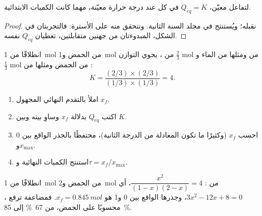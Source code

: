 \begin{proposition}\label{prop:g12:equilibrium:constant}
لتفاعل معيّن، $Q_{eq} = K$ في كل  عند درجة حرارة
معيّنة، مهما كانت الكميات الابتدائية.
\end{proposition}

\begin{proof}
نقبله؛ ويُستنتج في مجلد السنة الثانية. ونتحقق منه على
الأسترة: فالتجربتان في الشكل، المبدوءتان من جهتين متقابلتين،
تعطيان $Q_{eq}$ نفسه.
\end{proof}

\begin{example}\label{ex:g12:equilibrium:k-ester}
انطلاقًا من \qty{1}{mol} من الحمض و\qty{1}{mol} من ، يحوي التوازن
$\frac{2}{3}$ mol من  ومثلها من الماء و$\frac{1}{3}$ mol من
الحمض ومثلها من :
\[
  K = \frac{(2/3)\times(2/3)}{(1/3)\times(1/3)} = 4 .
\]
\end{example}

\begin{method}\label{met:g12:equilibrium:final}
\begin{enumerate}
  \item املأ  بالتقدم النهائي المجهول $x_f$.
  \item اكتب $Q_{eq}$ بدلالة $x_f$ وساوِ بينه وبين $K$.
  \item احسب $x_f$ (وكثيرًا ما تكون المعادلة من الدرجة الثانية)، محتفظًا بالجذر
        الواقع بين 0 و$x_{\max}$.
  \item استنتج الكميات النهائية و$\tau = x_f/x_{\max}$.
\end{enumerate}
\end{method}

\begin{example}\label{ex:g12:equilibrium:excess}
انطلاقًا من \qty{1}{mol} من الحمض و\qty{2}{mol} من :
$\dfrac{x^2}{(1-x)(2-x)} = 4$، أي $3x^2 - 12x + 8 = 0$، وجذرها
الواقع بين 0 و1 هو $x_f = \qty{0.845}{mol}$. فمضاعفة  ترفع
، محسوبًا على الحمض، من \qty{67}{\percent} إلى
\qty{85}{\percent}.
\end{example}

